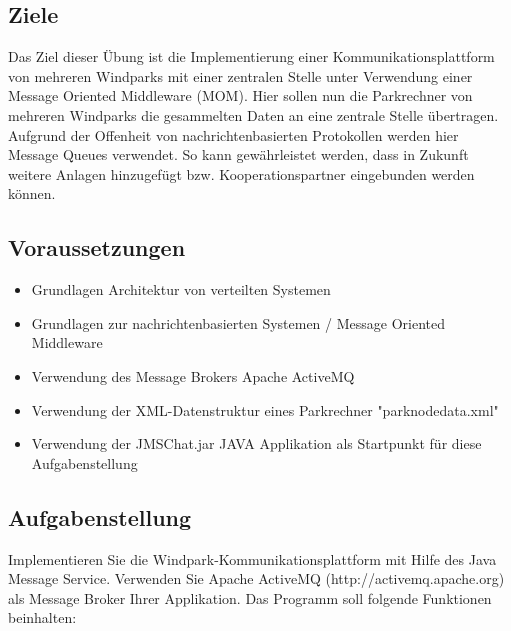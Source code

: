 \subsection{Ziele}

Das Ziel dieser Übung ist die Implementierung einer Kommunikationsplattform von mehreren Windparks mit einer zentralen Stelle unter Verwendung einer Message Oriented Middleware (MOM). Hier sollen nun die Parkrechner von mehreren Windparks die gesammelten Daten an eine zentrale Stelle übertragen. Aufgrund der Offenheit von nachrichtenbasierten Protokollen werden hier Message Queues verwendet. So kann gewährleistet werden, dass in Zukunft weitere Anlagen hinzugefügt bzw. Kooperationspartner eingebunden werden können.

\subsection{Voraussetzungen}

\begin{itemize}
    \item Grundlagen Architektur von verteilten Systemen
    \item Grundlagen zur nachrichtenbasierten Systemen / Message Oriented Middleware
    \item Verwendung des Message Brokers Apache ActiveMQ
    \item Verwendung der XML-Datenstruktur eines Parkrechner "parknodedata.xml"
    \item Verwendung der JMSChat.jar JAVA Applikation als Startpunkt für diese Aufgabenstellung
\end{itemize}

\subsection{Aufgabenstellung}

Implementieren Sie die Windpark-Kommunikationsplattform mit Hilfe des Java Message Service. Verwenden Sie Apache ActiveMQ (http://activemq.apache.org) als Message Broker Ihrer Applikation. Das Programm soll folgende Funktionen beinhalten:

